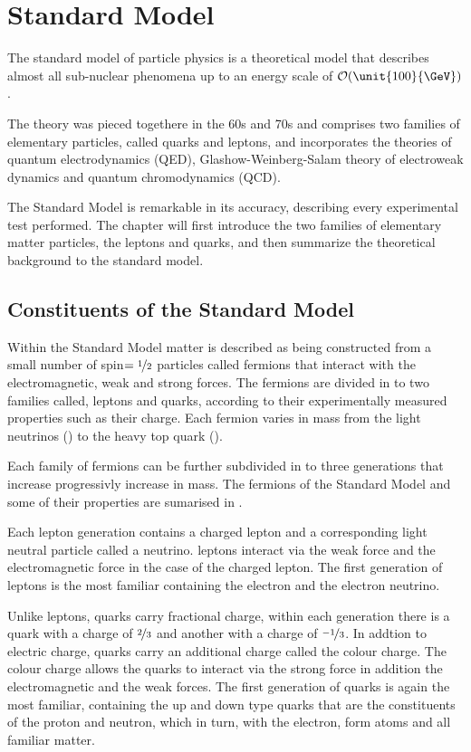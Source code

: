 \chapter{Standard Model}

The standard model of particle physics is a theoretical model that describes
almost all sub-nuclear phenomena up to an energy scale of
$\mathcal{O}(\unit{100}{\GeV})$.

The theory was pieced togethere in the 60s and 70s and comprises two families of
elementary particles, called quarks and leptons, and incorporates the theories
of quantum electrodynamics (QED), Glashow-Weinberg-Salam theory of electroweak
dynamics and quantum chromodynamics (QCD).

The Standard Model is remarkable in its accuracy, describing every experimental
test performed.  
The chapter will first introduce the two families of elementary matter
particles, the leptons and quarks, and then summarize the theoretical background
to the standard model.



\section{Constituents of the Standard Model}
Within the Standard Model matter is described as being constructed from a small
number of spin$=\nicefrac{1}{2}$ particles called fermions that interact with
the electromagnetic, weak and strong forces. The fermions are divided in to two
families called, leptons and quarks, according to their experimentally measured
properties such as their charge. Each fermion varies in mass from the light
neutrinos () to the heavy top quark ().

Each family of fermions can be further subdivided in to three generations that
increase progressivly increase in mass. The fermions of the Standard Model and
some of their properties are sumarised in \TableRef{}. 

Each lepton generation contains a charged lepton and a corresponding light
neutral particle called a neutrino. leptons interact via the weak force and the
electromagnetic force in the case of the charged lepton.  The first generation
of leptons is the most familiar containing the electron and the electron
neutrino.

Unlike leptons, quarks carry fractional charge, within each generation there is
a quark with a charge of $\nicefrac{2}{3}$ and another with a charge of
$\nicefrac{-1}{3}$. In  addtion to electric charge, quarks carry an additional
charge called the colour charge. The colour charge allows the quarks to interact
via the strong force in addition the electromagnetic and the weak forces.
The first generation of quarks is again the most familiar, containing the up and
down type quarks that are the constituents of the proton and neutron, which in
turn, with the electron, form atoms and all familiar matter.


